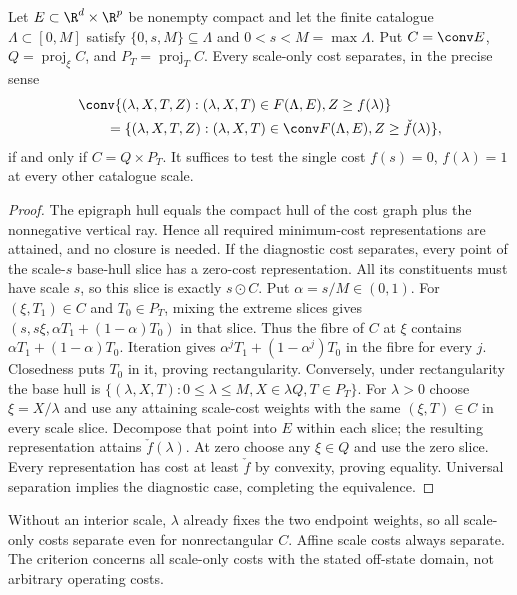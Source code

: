 \begin{proposition}\label{prop:scale-rectangularity}
Let $E\subset\R^d\times\R^p$ be nonempty compact and let the finite
catalogue $\Lambda\subset[0,M]$ satisfy $\{0,s,M\}\subseteq\Lambda$
and $0<s<M=\max\Lambda$. Put $C=\conv E$,
$Q=\operatorname{proj}_\xi C$, and $P_T=\operatorname{proj}_T C$.
Every scale-only cost separates, in the precise sense
\begin{equation}\label{eq:scale-cost-separation}
 \begin{split}
 &\conv\{(\lambda,X,T,Z):(\lambda,X,T)\in F(\Lambda,E),Z\ge f(\lambda)\}\\
 &\qquad=\{(\lambda,X,T,Z):(\lambda,X,T)\in\conv F(\Lambda,E),
                         Z\ge\check f(\lambda)\},
 \end{split}
\end{equation}
if and only if $C=Q\times P_T$. It suffices to test the single cost
$f(s)=0$, $f(\lambda)=1$ at every other catalogue scale.
\end{proposition}
\begin{proof}
The epigraph hull equals the compact hull of the cost graph plus the
nonnegative vertical ray. Hence all required minimum-cost representations
are attained, and no closure is needed. If the diagnostic cost
separates, every point of the scale-$s$ base-hull slice has a zero-cost
representation. All its constituents must have scale $s$, so this slice
is exactly $s\odot C$. Put $\alpha=s/M\in(0,1)$. For
$(\xi,T_1)\in C$ and $T_0\in P_T$, mixing the extreme slices gives
$(s,s\xi,\alpha T_1+(1-\alpha)T_0)$ in that slice. Thus the fibre of
$C$ at $\xi$ contains $\alpha T_1+(1-\alpha)T_0$. Iteration gives
$\alpha^jT_1+(1-\alpha^j)T_0$ in the fibre for every $j$. Closedness
puts $T_0$ in it, proving rectangularity.
Conversely, under rectangularity the base hull is
$\{(\lambda,X,T):0\le\lambda\le M,X\in\lambda Q,T\in P_T\}$.
For $\lambda>0$ choose $\xi=X/\lambda$ and use any attaining scale-cost
weights with the same $(\xi,T)\in C$ in every scale slice. Decompose
that point into $E$ within each slice; the resulting representation
attains $\check f(\lambda)$. At zero choose any $\xi\in Q$ and use
the zero slice. Every representation has cost at least $\check f$ by
convexity, proving equality. Universal separation implies the diagnostic
case, completing the equivalence.
\end{proof}
Without an interior scale, $\lambda$ already fixes the two endpoint
weights, so all scale-only costs separate even for nonrectangular $C$.
Affine scale costs always separate. The criterion concerns all scale-only
costs with the stated off-state domain, not arbitrary operating costs.


